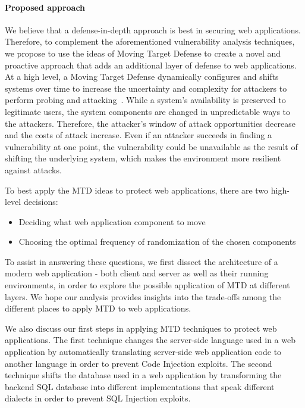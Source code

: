\paragraph{Proposed approach}
We believe that a defense-in-depth approach is best in securing web applications. Therefore, to complement the aforementioned vulnerability analysis techniques, we propose to use the ideas of Moving Target Defense to create a novel and proactive approach that adds an additional layer of defense to web applications.
At a high level, a Moving Target Defense dynamically configures and shifts systems over time to increase the uncertainty and complexity for attackers to perform probing and attacking~\cite{cui2011symbiotes,zhuang2014}.
While a system's availability is preserved to legitimate users,
the system components are changed in unpredictable ways to the attackers.
Therefore, the attacker's window of attack opportunities decrease and the costs of attack increase.
Even if an attacker succeeds in finding a vulnerability at one point,
the vulnerability could be unavailable as the result of shifting the underlying system,
which makes the environment more resilient against attacks.

To best apply the MTD ideas to protect web applications,
there are two high-level decisions:
\begin{itemize}
	\item Deciding what web application component to move
	\item Choosing the optimal frequency of randomization of the chosen components
\end{itemize}
To assist in answering these questions, we first dissect the architecture of a modern web application - both client and server as well as their running environments, in order to explore the possible application of MTD at different layers. 
We hope our analysis provides insights into the trade-offs among the different places to apply MTD to web applications.

We also discuss our first steps in applying MTD techniques to protect web applications.
The first technique changes the server-side language used in a web application by automatically translating server-side web application code to another language in order to prevent Code Injection exploits.
The second technique shifts the database used in a web application by transforming the backend SQL database into different implementations that speak different dialects in order to prevent SQL Injection exploits.

\begin{comment}
\noindent{}The main contributions of this paper are the following:
\begin{itemize}
\item We discuss the possibilities of applying moving target defense to different layers of web applications.
\item We propose two novel approaches to changing the implementation language of a web application
and the database implementation while keeping the functionality.
\end{itemize}
\end{comment}
